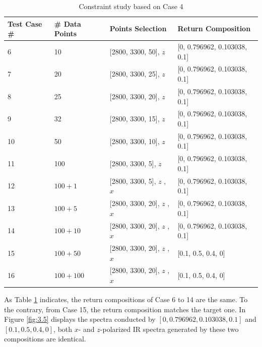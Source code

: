 \begin{table} \small
\begin{center}
\begin{tabular}{| p{3cm} | p{3cm} | p{5cm} | l |} \hline
	Test Case \# & \# Data Points & Points Selection & Return Composition \\ \hline
	6 & 10 & [2800, 3300, 50], $z$ & [0, 0.796962, 0.103038, 0.1] \\ \hline
	7 & 20 & [2800, 3300, 25], $z$ & [0, 0.796962, 0.103038, 0.1] \\ \hline
	8 & 25 & [2800, 3300, 20], $z$ & [0, 0.796962, 0.103038, 0.1] \\ \hline
	9 & 32 & [2800, 3300, 15], $z$ & [0, 0.796962, 0.103038, 0.1] \\ \hline
	10 & 50 & [2800, 3300, 10], $z$ & [0, 0.796962, 0.103038, 0.1] \\ \hline
	11 & 100 & [2800, 3300, 5], $z$ & [0, 0.796962, 0.103038, 0.1] \\ \hline
	12 & $100 + 1$ & [2800, 3300, 5], $z$ \newline [2800, 3300, 500], $x$ & [0, 0.796962, 0.103038, 0.1] \\ \hline
	13 & $100 + 5$ & [2800, 3300, 20], $z$ \newline [2800, 3300, 100], $x$ & [0, 0.796962, 0.103038, 0.1] \\ \hline
	14 & $100 + 10$ & [2800, 3300, 20], $z$ \newline  [2800, 3300, 50], $x$ & [0, 0.796962, 0.103038, 0.1] \\ \hline
	15 & $100 + 50$ & [2800, 3300, 20], $z$ \newline  [2800, 3300, 10], $x$ & [0.1, 0.5, 0.4, 0] \\ \hline
	16 & $100 + 100$ & [2800, 3300, 20], $z$ \newline  [2800, 3300, 5], $x$ & [0.1, 0.5, 0.4, 0] \\ 
	\hline
\end{tabular} 
\end{center}
\caption{Constraint study based on Case 4} \label{tab:3.4}
\end{table}

As Table \ref{tab:3.4} indicates, the return compositions of Case 6 to 14 are the same. To the contrary, from Case 15, the return composition matches the target one. In Figure \ref{fig:3.5} displays the spectra conducted by $[0, 0.796962, 0.103038, 0.1]$ and $[0.1, 0.5, 0.4, 0]$, both $x$- and $z$-polarized IR spectra generated by these two compositions are identical.

